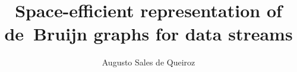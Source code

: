 \documentclass[bsc,en,scr]{ufpethesis}
\institute{Centro de Informática}
\author{Augusto Sales de Queiroz}
\title{Space-efficient representation of de~Bruijn graphs for data streams}
\begin{document}
    \frontmatter
    \frontpage
    \presentationpage
    \begin{dedicatory}

    \end{dedicatory}

    \acknowledgements



    \begin{epigraph}[<nota>][<autor>]

    \end{epigraph}

    
    

    \tableofcontents
    \listoffigures

    \mainmatter
	\linenumbers
	\doublespacing
    
    
    
    
    

    \backmatter
    
    
\end{document}
